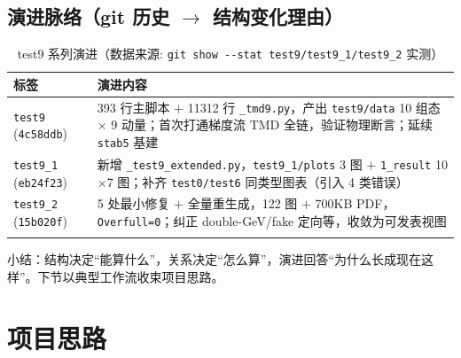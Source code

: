 \documentclass[UTF8]{ctexart}
\begin{document}
\subsection{演进脉络（git 历史 $\rightarrow$ 结构变化理由）}
\small
\begin{xltabular}{\textwidth}{lX}
\toprule
\textcolor{relation}{标签} & \textcolor{relation}{演进内容} \\
\midrule
\endhead
\texttt{\nolinkurl{test9}} (\texttt{\nolinkurl{4c58ddb}}) & 393 行主脚本 $+$ 11312 行 \texttt{\nolinkurl{\_tmd9.py}}，产出 \texttt{\nolinkurl{test9/data}} 10 组态 $\times$ 9 动量；首次打通梯度流 TMD 全链，验证物理断言；延续 \texttt{\nolinkurl{stab5}} 基建 \\
\texttt{\nolinkurl{test9\_1}} (\texttt{\nolinkurl{eb24f23}}) & 新增 \texttt{\nolinkurl{\_test9\_extended.py}}，\texttt{\nolinkurl{test9\_1/plots}} 3 图 $+$ \texttt{\nolinkurl{1\_result}} 10$\times$7 图；补齐 \texttt{\nolinkurl{test0/test6}} 同类型图表（引入 4 类错误） \\
\texttt{\nolinkurl{test9\_2}} (\texttt{\nolinkurl{15b020f}}) & 5 处最小修复 $+$ 全量重生成，122 图 $+$ 700KB PDF，\texttt{\nolinkurl{Overfull=0}}；纠正 double-GeV/fake 定向等，收敛为可发表视图 \\
\bottomrule
\caption{test9 系列演进（数据来源: \texttt{\nolinkurl{git show --stat test9/test9\_1/test9\_2}} 实测）}
\end{xltabular}

小结：结构决定“能算什么”，关系决定“怎么算”，演进回答“为什么长成现在这样”。下节以典型工作流收束项目思路。

\section{项目思路}
\label{sec:idea}
\end{document}
